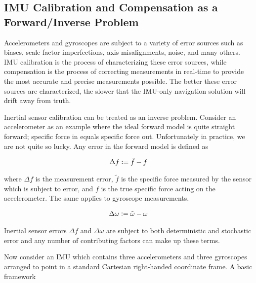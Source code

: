\subsection{IMU Calibration and Compensation as a Forward/Inverse Problem}

Accelerometers and gyroscopes are subject to a variety of error sources such as biases, scale factor imperfections, axis misalignments, noise, and many others. IMU calibration is the process of characterizing these error sources, while compensation is the process of correcting measurements in real-time to provide the most accurate and precise measurements possible. The better these error sources are characterized, the slower that the IMU-only navigation solution will drift away from truth. 

Inertial sensor calibration can be treated as an inverse problem. Consider an accelerometer as an example where the ideal forward model is quite straight forward; specific force in equals specific force out. Unfortunately in practice, we are not quite so lucky. Any error in the forward model is defined as

\begin{align*}
	\Delta f \vcentcolon= \tilde{f} - f
\end{align*}

where $\Delta f$ is the measurement error, $\tilde{f}$ is the specific force measured by the sensor which is subject to error, and $f$ is the true specific force acting on the accelerometer. The same applies to gyroscope measurements. 

\begin{align*}
	\Delta \omega \vcentcolon= \tilde{\omega} - \omega
\end{align*}

Inertial sensor errors $\Delta f$ and $\Delta \omega$ are subject to both deterministic and stochastic error and any number of contributing factors can make up these terms.

Now consider an IMU which contains three accelerometers and three gyroscopes arranged to point in a standard Cartesian right-handed coordinate frame. A basic framework

